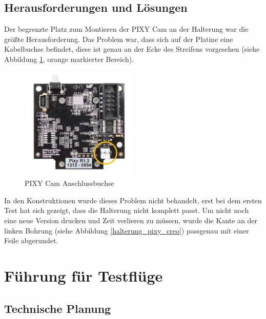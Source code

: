 	\subsection{Herausforderungen und Lösungen}

	Der begrenzte Platz zum Montieren der PIXY Cam an der Halterung war die größte Herausforderung.
	Das  Problem war, dass sich auf der Platine eine Kabelbuchse befindet, diese ist genau an der Ecke des Streifens vorgesehen (siehe Abbildung \ref{PIXY_Cam_Hinterseite}, orange markierter Bereich).

			\begin{figure}[H]
			\begin{centering}
			\includegraphics[width = 0.5\textwidth]{Bilder/PIXY_Cam_Hinterseite}
			\par\end{centering}
			\caption[PIXY Cam Anschlussbuchse]{PIXY Cam Anschlussbuchse\cite{PIXY_Cmu_cam5}}
			\label{PIXY_Cam_Hinterseite}
			\end{figure}

	In den Konstruktionen wurde dieses Problem nicht behandelt, erst bei dem ersten Test hat sich gezeigt, dass die Halterung nicht komplett passt.
	Um nicht noch eine neue Version drucken und Zeit verlieren zu müssen, wurde die Kante an der linken Bohrung (siehe Abbildung \ref{halterung_pixy_creo}) passgenau mit einer Feile abgerundet.

			\newpage

\section{Führung für Testflüge}

	\subsection{Technische Planung}


